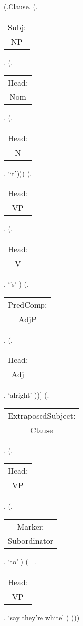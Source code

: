 \documentclass[12pt]{standalone}
\newcommand{\NL}[2]{\begin{tabular}[t]{c}\small\textsf{#1:}\\
#2\end{tabular}}
\begin{document}
\begin{parsetree}
(.Clause.
	(.\NL{Subj}{NP}. 
	(.\NL{Head}{Nom}.
	(.\NL{Head}{N}. `it')))
	(.\NL{Head}{VP}.
	(.\NL{Head}{V}. `\textquoteright s' )
	(.\NL{PredComp}{AdjP}. 
	(.\NL{Head}{Adj}. `alright' )))
	(.\NL{ExtraposedSubject}{Clause}. 
	(.\NL{Head}{VP}. 
	(.\NL{Marker}{Subordinator}. `to' )
	(~ .\NL{Head}{VP}.  `say they\textquoteright re white' )
)))
\end{parsetree}
\end{document}
